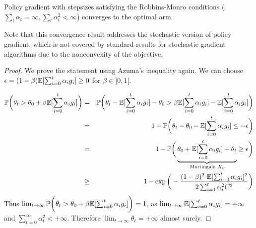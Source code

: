 \begin{proposition}
\label{prop_vpg_cv}
Policy gradient with stepsizes satisfying the Robbins-Monro conditions ($\sum_t \alpha_t = \infty, \sum_t \alpha_t^2 < \infty$) converges to the optimal arm.
\end{proposition}
Note that this convergence result addresses the stochastic version of policy gradient, which is not covered by standard results for stochastic gradient algorithms due to the nonconvexity of the objective. 
\begin{proof}
We prove the statement using Azuma's inequality again.
We can choose $\epsilon = (1-\beta) \mathbb{E}[\sum_{i=0}^{t}\alpha_i g_i] \ge 0$ for $\beta \in ]0,1[$.

\begin{eqnarray*}
{\mathbb{P}}\bigg( \theta_t >  \theta_0 + \beta \mathbb{E}[\sum_{i=0}^{t}\alpha_i g_i]  \bigg) &=&{\mathbb{P}}\bigg( \theta_t - \mathbb{E}[\sum_{i=0}^{t}\alpha_i g_i] -\theta_0 >   \beta \mathbb{E}[\sum_{i=0}^{t}\alpha_i g_i] -\mathbb{E}[\sum_{i=0}^{t}\alpha_i g_i] \bigg)  \\ 
&=& 1-{\mathbb{P}} \bigg( \theta_t - \theta_0  -\mathbb{E}[\sum_{i=0}^{t}\alpha_i g_i] \le -\epsilon\bigg)\\
&=& 1-{\mathbb{P}} \bigg( \underbrace{\theta_0  + \mathbb{E}[\sum_{i=0}^{t}\alpha_i g_i] - \theta_t  }_{\text{Martingale} \ X_t} \ge \epsilon\bigg)\\
&\ge& 1- \exp\bigg( -\frac{(1-\beta)^2\ \mathbb{E}[\sum_{i=0}^{t}\alpha_i g_i]^2}{2\sum_{i=1}^t \alpha_i^2 C^2}\bigg)\\
\end{eqnarray*}
Thus $\lim_{t \to \infty} {\mathbb{P}}\bigg( \theta_t >  \theta_0 + \beta \mathbb{E}[\sum_{i=0}^{t}\alpha_i g_i]   \bigg) = 1$, as $\lim_{t\to \infty} \mathbb{E}[\sum_{i=0}^{t}\alpha_i g_i]  = +\infty$ and $\sum_{t=0}^\infty \alpha_t^2 < +\infty$. Therefore $\lim_{t\to\infty} \theta_t = +\infty$ almost surely.
\end{proof}

